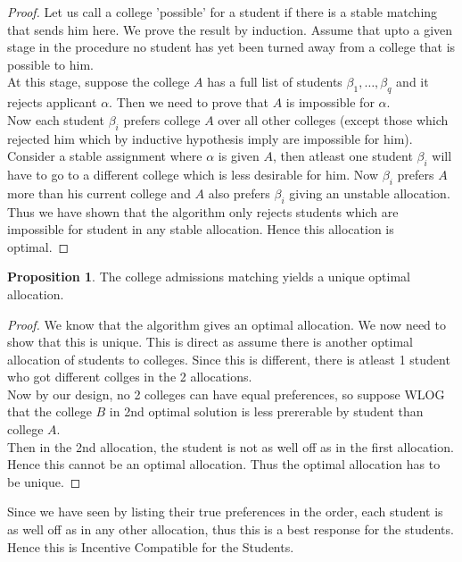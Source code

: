 \documentclass{article}
\theoremstyle{definition}
\newtheorem{prop}{Proposition}[section]
\begin{document}
\begin{proof}
Let us call a college 'possible' for a student if there is a stable matching that sends him here. We prove the result by induction. Assume that upto a given stage in the procedure no student has yet been turned away from a college that is possible to him.\\
At this stage, suppose the college $A$ has a full list of students $\beta_1,\dots,\beta_q$ and it rejects applicant $\alpha$. Then we need to prove that $A$ is impossible for $\alpha$.\\
Now each student $\beta_i$ prefers college $A$ over all other colleges (except those which rejected him which by inductive hypothesis imply are impossible for him). Consider a stable assignment where $\alpha$ is given $A$, then atleast one student $\beta_i$ will have to go to a different college which is less desirable for him. Now $\beta_i$ prefers $A$ more than his current college and $A$ also prefers $\beta_i$ giving an unstable allocation.\\
Thus we have shown that the algorithm only rejects students which are impossible for student in any stable allocation. Hence this allocation is optimal.
\end{proof}
\begin{prop}
The college admissions matching yields a unique optimal allocation.
\end{prop}
\begin{proof}
We know that the algorithm gives an optimal allocation. We now need to show that this is unique. This is direct as assume there is another optimal allocation of students to colleges. Since this is different, there is atleast 1 student who got different collges in the 2 allocations.\\
Now by our design, no 2 colleges can have equal preferences, so suppose WLOG that the college $B$ in 2nd optimal solution is less prererable by student than college $A$.\\
Then in the 2nd allocation, the student is not as well off as in the first allocation. Hence this cannot be an optimal allocation. Thus the optimal allocation has to be unique.
\end{proof}

Since we have seen by listing their true preferences in the order, each student is as well off as in any other allocation, thus this is a best response for the students. Hence this is Incentive Compatible for the Students.\\
\end{document}
